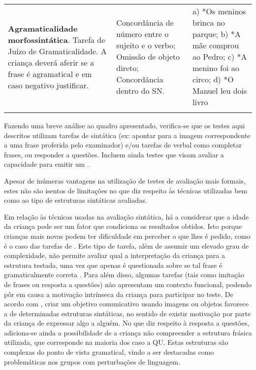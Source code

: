 \documentclass[output=paper]{LSP/langsci}
\begin{document}
\begin{table}
{\begin{tabular}{p{4cm}p{4cm}p{4cm}}
\textbf{Agramaticalidade morfossintática}. Tarefa de Juízo de Gramaticalidade. A criança deverá aferir se a frase é agramatical e em caso negativo justificar.                                                                  & Concordância de número entre o sujeito e o verbo; Omissão de objeto direto; Concordância dentro do SN. & a) *Os meninos brinca no parque; b) *A mãe comprou ao Pedro; c) *A menino foi ao circo; d) *O Manuel leu dois livro   \\
\lspbottomrule
\end{tabular}}
\end{table}
\clearpage
Fazendo uma breve análise ao quadro apresentado, verifica-se que os testes aqui descritos utilizam tarefas de  sintática (ex: apontar para a imagem correspondente a uma frase proferida pelo examinador) e/ou tarefas de  verbal como completar frases, ou responder a questões. Incluem ainda testes que visam avaliar a capacidade para emitir um . 

Apesar de inúmeras vantagens na utilização de testes de avaliação mais formais, estes não são isentos de limitações no que diz respeito às técnicas utilizadas bem como ao tipo de estruturas sintáticas avaliadas.

Em relação às técnicas usadas na avaliação sintática, há a considerar que a idade da criança pode ser um fator que condiciona os resultados obtidos. Isto porque crianças mais novas podem ter dificuldade em perceber o que lhes é pedido, como é o caso das tarefas de . Este tipo de tarefa, além de assumir um elevado grau de complexidade, não permite avaliar qual a interpretação da criança para a estrutura testada, uma vez que apenas é questionada sobre se tal frase é gramaticalmente correta \citep{white2003}. Para além disso, algumas tarefas (tais como imitação de frases ou resposta a questões) não apresentam um contexto funcional, podendo pôr em causa a motivação intrínseca da criança para participar no teste. De acordo com \cite{vinther2002}, criar um objetivo comunicativo usando imagens ou objetos favorece a  de determinadas estruturas sintáticas, no sentido de existir motivação por parte da criança de expressar algo a alguém. No que diz respeito à resposta a questões, adiciona-se ainda a possibilidade de a criança não compreender a estrutura frásica utilizada, que corresponde na maioria dos caso a  QU. Estas estruturas são complexas do ponto de vista gramatical, vindo a ser destacadas como problemáticas nos grupos com perturbações de linguagem. 
\end{document}
